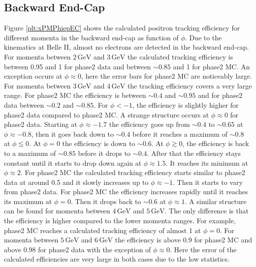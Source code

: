 \documentclass[a4paper,11pt,twosided,final,german,openbib,pdftex,listof=totoc,bibliography=totoc]{scrbook}
\begin{document}
\newpage
\subsection{Backward End-Cap}
\label{sec:MEC}

Figure \ref{plt:xPMPhiepEC} shows the calculated positron tracking efficiency for different momenta in the backward end-cap as function of $\phi$. 
Due to the kinematics at Belle II, almost no electrons are detected in the backward end-cap. 
For momenta between $2\,\textrm{GeV}$ and $3\,\textrm{GeV}$ the calculated tracking efficiency is between 0.95 and 1 for phase2 data and between $\sim 0.85$ and 1 for phase2 MC. An exception occurs at $\phi \approx 0$, here the error bars for phase2 MC are noticeably large. 
For momenta between $3\,\textrm{GeV}$ and $4\,\textrm{GeV}$ the tracking efficiency covers a very large range. For phase2 MC the efficiency is between $\sim 0.4$ and $\sim 0.95$ and for phase2 data between $\sim 0.2$ and $ \sim 0.85$. For $\phi < -1$, the efficiency is slightly higher for phase2 data compared to phase2 MC. 
A strange structure occurs at $\phi \approx 0$ for phase2 data. Starting at  $\phi \approx -1.7$ the efficiency goes up from $\sim 0.4$ to $\sim 0.65$ at $\phi \approx -0.8$, then it goes back down to $\sim 0.4$ before it reaches a maximum of $\sim 0.8$ at $\phi \lesssim 0$.
At $\phi =0$ the efficiency is down to $\sim 0.6$. At $\phi \gtrsim 0$, the efficiency is back to a maximum of $\sim 0.85$ before it drops to $\sim 0.4$.
After that the efficiency stays constant until it starts to drop down again at $\phi \approx 1.5$. It reaches its minimum at $\phi \approx 2$.
For phase2 MC the calculated tracking efficiency starts similar to phase2 data at around 0.5 and it slowly increases up to $\phi \approx -1$. Then it starts to vary from phase2 data. For phase2 MC the efficiency  increases rapidly until it reaches its maximum at $\phi = 0$. Then it drops back to $\sim 0.6$ at $\phi \approx 1$.
A similar structure can be found for momenta between $4\,\textrm{GeV}$ and $5\,\textrm{GeV}$. The only difference is that the efficiency is higher compared to the lower momenta ranges. For example, phase2 MC reaches a calculated tracking efficiency of almost 1 at $\phi =0$.
For momenta between $5\,\textrm{GeV}$ and $6\,\textrm{GeV}$ the efficiency is above 0.9 for  phase2 MC and above 0.98 for phase2 data with the exception of $\phi \approx 0$. Here the error of the calculated efficiencies are very large in both cases due to the low statistics.
\end{document}
